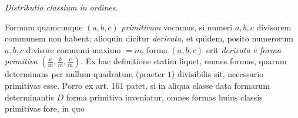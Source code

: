 \begin{center}
\textit{Distributio classium in ordines.}
\end{center}

Formam quamcunque $(a,b,c)$ \textit{primitivam} vocamus, si numeri $a,b,c$
divisorem communem non habent; alioquin dicitur \textit{derivata,} et quidem,
posito numerorum $a,b,c$ divisore communi maximo $=m$, forma $(a,b,c)$
erit \textit{derivata e forma primitiva} $\left(\frac{a}{m},\frac{b}{m},\frac{c}{m}\right)$.
Ex hac definitione statim liquet, omnes formas, quarum determinans per nullum
quadratum (praeter $1$) divisibilis sit, necessario primitivas esse. Porro ex
art. 161 patet, si in aliqua classe data formarum determinantis $D$ forma
primitiva inveniatur, omnes formas huius classis primitivas fore, in quo

